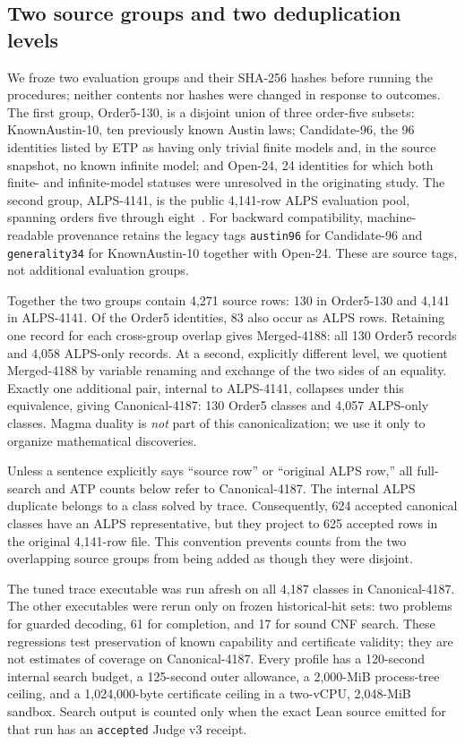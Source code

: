 \documentclass[runningheads]{llncs}
\begin{document}
\subsection{Two source groups and two deduplication levels}

We froze two evaluation groups and their SHA-256 hashes before running the
procedures; neither contents nor hashes were changed in response to outcomes.
The first group, Order5-130, is a disjoint union of three order-five
subsets: KnownAustin-10, ten previously known Austin laws;
Candidate-96, the 96 identities listed by ETP as having only trivial
finite models and, in the source snapshot, no known infinite model; and
Open-24, 24 identities for which both finite- and infinite-model statuses
were unresolved in the originating study.  The second group,
ALPS-4141, is the public 4,141-row ALPS evaluation pool, spanning orders
five through eight~\cite{ALPSData2026,XieEtAl2026ALPS}.
For backward compatibility, machine-readable provenance retains the legacy
tags \texttt{austin96} for Candidate-96 and \texttt{generality34} for
KnownAustin-10 together with Open-24.  These are source tags, not additional
evaluation groups.

Together the two groups contain 4,271 source rows: 130 in Order5-130 and 4,141
in ALPS-4141.  Of the Order5 identities, 83 also occur as ALPS rows.  Retaining one record
for each cross-group overlap gives Merged-4188: all 130 Order5 records
and 4,058 ALPS-only records.  At a second, explicitly different level, we
quotient Merged-4188 by variable renaming and exchange of the two sides of an
equality.  Exactly one additional pair, internal to ALPS-4141, collapses under
this equivalence, giving Canonical-4187: 130 Order5 classes and 4,057
ALPS-only classes.  Magma duality is \emph{not} part of this canonicalization;
we use it only to organize mathematical discoveries.

Unless a sentence explicitly says ``source row'' or ``original ALPS row,'' all
full-search and ATP counts below refer to Canonical-4187.  The internal ALPS
duplicate belongs to a class solved by trace.  Consequently, 624 accepted
canonical classes have an ALPS representative, but they project to 625
accepted rows in the original 4,141-row file.  This convention prevents counts
from the two overlapping source groups from being added as though they were
disjoint.

The tuned trace executable was run afresh on all 4,187 classes in
Canonical-4187.
The other executables were rerun only on frozen historical-hit sets: two
problems for guarded decoding, 61 for completion, and 17 for sound CNF search.
These regressions test preservation of known capability and certificate
validity; they are not estimates of coverage on Canonical-4187.  Every profile has
a 120-second internal search budget, a 125-second outer allowance, a
2,000-MiB process-tree ceiling, and a 1,024,000-byte certificate ceiling in a
two-vCPU, 2,048-MiB sandbox.  Search output is counted only when the exact Lean
source emitted for that run has an \texttt{accepted} Judge v3 receipt.
\end{document}

